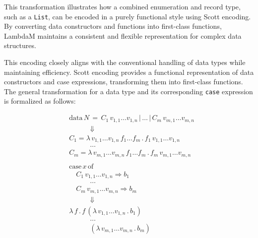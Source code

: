 \documentclass{IEEEtran}
\begin{document}
\par This transformation illustrates how a combined enumeration and record type, such as a \texttt{List}, can be encoded in a purely functional style using Scott encoding. By converting data constructors and functions into first-class functions, LambdaM maintains a consistent and flexible representation for complex data structures.

\par This encoding closely aligns with the conventional handling of data types while maintaining efficiency. Scott encoding provides a functional representation of data constructors and case expressions, transforming them into first-class functions. The general transformation for a data type and its corresponding \texttt{case} expression is formalized as follows:

\begin{align*}
&\text{data} \, N \, = \, C_1 \, v_{1,1} \dots v_{1,n} \, | \, \dots \, | \, C_m \, v_{m,1} \dots v_{m,n} \\
&\quad \quad \quad \Downarrow \\
&C_1 = \lambda \, v_{1,1} \dots v_{1,n} \, f_1 \dots f_m \, . \, f_1 \, v_{1,1} \dots v_{1,n} \\
&\quad \quad \quad \dots \\
&C_m = \lambda \, v_{m,1} \dots v_{m,n} \, f_1 \dots f_m \, . \, f_m \, v_{m,1} \dots v_{m,n} \\
&\\
&\text{case} \, x \, \text{of} \\
&\quad C_1 \, v_{1,1} \dots v_{1,n} \Rightarrow b_1 \\
&\quad \quad \quad \dots \\
&\quad C_m \, v_{m,1} \dots v_{m,n} \Rightarrow b_m \\
&\quad \quad \quad \Downarrow \\
&\lambda \, f \, . \, f \, (\lambda \, v_{1,1} \dots v_{1,n} \, . \, b_1) \\
&\quad \quad \quad \dots \\
&\quad \quad \quad (\lambda \, v_{m,1} \dots v_{m,n} \, . \, b_m) \\
\end{align*}

\begingroup
\vspace*{-\baselineskip}
\vspace*{\baselineskip}
\endgroup
\end{document}
